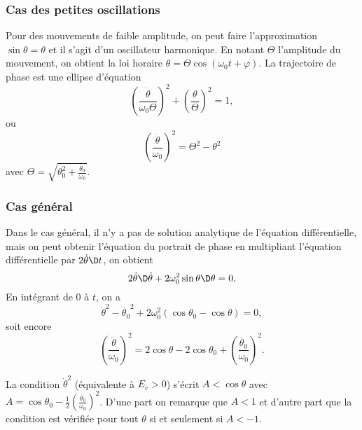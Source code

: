 \subsubsection{Cas des petites oscillations}

Pour des mouvements de faible amplitude, on peut faire l'approximation $\sin\theta = \theta$ et il s'agit d'un oscillateur harmonique. En notant $\Theta$ l'amplitude du mouvement, on obtient la loi horaire $\theta = \Theta\cos(\omega_0 t +\varphi)$. La trajectoire de phase est une ellipse d'équation
\begin{equation}
  \left(\frac{\dot{\theta}}{\omega_0 \Theta}\right)^2 + \left(\frac{\theta}{\Theta}\right)^2=1,
\end{equation}
ou
\begin{equation}
  \left(\frac{\dot{\theta}}{\omega_0}\right)^2 = \Theta^2-\theta^2
\end{equation}
avec $\Theta = \sqrt{\theta_0^2+\frac{\dot{\theta_0}}{\omega_0}}$.

\subsubsection{Cas général}

Dans le cas général, il n'y a pas de solution analytique de l'équation différentielle, mais on peut obtenir l'équation du portrait de phase en multipliant l'équation différentielle par $2\dot{\theta} \D t$, on obtient
\begin{equation}
  2\dot{\theta} \D \dot{\theta} + 2\omega_0^2\sin\theta \D \theta=0.
\end{equation}
En intégrant de $0$ à $t$, on a
\begin{equation}
  \dot{\theta}^2-\dot{\theta_0}^2+2\omega_0^2(\cos\theta_0 - \cos\theta)=0,
\end{equation}
soit encore
\begin{equation}
  \left(\frac{\dot{\theta}}{\omega_0}\right)^2 = 2\cos\theta - 2\cos\theta_0 + \left(\frac{\dot{\theta_0}}{\omega_0}\right)^2.
\end{equation}

La condition $\dot\theta^2$ (équivalente à $E_c>0$) s'écrit $A<\cos\theta$ avec $A=\cos\theta_0 - \frac{1}{2}\left(\frac{\dot{\theta_0}}{\omega_0}\right)^2$. D'une part on remarque que $A<1$ et d'autre part que la condition est vérifiée pour tout $\theta$ si et seulement si $A<-1$.

